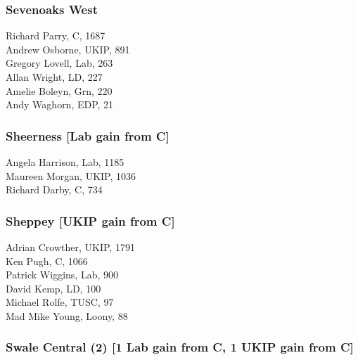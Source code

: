 \documentclass[a4paper,openany,10pt]{book}
\begin{document}
\subsubsection*{Sevenoaks West}



Richard Parry, C, 1687\\
Andrew Osborne, UKIP, 891\\
Gregory Lovell, Lab, 263\\
Allan Wright, LD, 227\\
Amelie Boleyn, Grn, 220\\
Andy Waghorn, EDP, 21\\


\subsubsection*{Sheerness \hspace*{\fill}\nolinebreak[1]%
\enspace\hspace*{\fill}
[Lab gain from C]}



Angela Harrison, Lab, 1185\\
Maureen Morgan, UKIP, 1036\\
Richard Darby, C, 734\\


\subsubsection*{Sheppey \hspace*{\fill}\nolinebreak[1]%
\enspace\hspace*{\fill}
[UKIP gain from C]}



Adrian Crowther, UKIP, 1791\\
Ken Pugh, C, 1066\\
Patrick Wiggins, Lab, 900\\
David Kemp, LD, 100\\
Michael Rolfe, TUSC, 97\\
Mad Mike Young, Loony, 88\\


\subsubsection*{Swale Central (2) \hspace*{\fill}\nolinebreak[1]%
\enspace\hspace*{\fill}
[1 Lab gain from C, 1 UKIP gain from C]}
\end{document}
